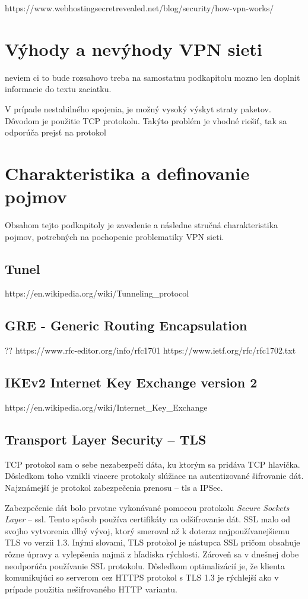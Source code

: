 https://www.webhostingsecretrevealed.net/blog/security/how-vpn-works/

\section{Výhody a nevýhody VPN sieti}
neviem ci to bude rozsahovo treba na samostatnu podkapitolu
mozno len doplnit informacie do textu zaciatku.

V prípade nestabilného spojenia, je možný vysoký výskyt straty paketov. Dôvodom je použitie TCP protokolu. Takýto problém je vhodné riešiť, tak sa odporúča prejsť na protokol 

\section{Charakteristika a definovanie pojmov}
Obsahom tejto podkapitoly je zavedenie a následne stručná charakteristika pojmov, potrebných na pochopenie problematiky VPN sieti.
\subsection{Tunel}
https://en.wikipedia.org/wiki/Tunneling\_protocol

\subsection{GRE - Generic Routing Encapsulation}\label{gre}
??
https://www.rfc-editor.org/info/rfc1701
https://www.ietf.org/rfc/rfc1702.txt

\subsection{IKEv2 Internet Key Exchange version 2}
https://en.wikipedia.org/wiki/Internet\_Key\_Exchange

\subsection{Transport Layer Security -- TLS}
TCP protokol sam o sebe nezabezpečí dáta, ku ktorým sa pridáva TCP hlavička. Dôsledkom toho vznikli viacere protokoly slúžiace na autentizované šifrovanie dát. Najznámejší je protokol zabezpečenia prenosu -- \acrshort{tls} a IPSec.

Zabezpečenie dát bolo prvotne vykonávané pomocou protokolu \textit{Secure Sockets Layer} -- \acrshort{ssl}. Tento spôsob používa certifikáty na odšifrovanie dát. SSL malo od svojho vytvorenia dlhý vývoj, ktorý smeroval až k doteraz najpoužívanejšiemu TLS vo verzii 1.3. Inými slovami, TLS protokol je nástupca SSL pričom obsahuje rôzne úpravy a vylepšenia najmä z hľadiska rýchlosti. Zároveň sa v dnešnej dobe neodporúča používanie SSL protokolu. Dôsledkom optimalizácií je, že klienta komunikujúci so serverom cez HTTPS protokol s TLS 1.3 je rýchlejší ako v prípade použitia nešifrovaného HTTP variantu. 

